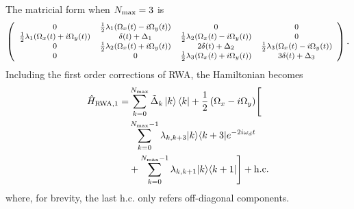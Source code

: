The matricial form when $N_{\mathrm{max}}=3$ is
\begin{equation}
  \footnotesize
  \left(\begin{array}{cccc}
      0                                                & \frac{1}{2} \lambda_1 (\Omega_{x}(t)-i \Omega_{y}(t)) & 0                                               & 0                                               \\
      \frac{1}{2} \lambda_1  (\Omega_{x}(t)+i \Omega_{y}(t)) & \delta (t)+\Delta_1                             & \frac{1}{2} \lambda_2 (\Omega_{x}(t)-i \Omega_{y}(t)) & 0                                               \\
      0                                                & \frac{1}{2} \lambda_2 (\Omega_{x}(t)+i \Omega_{y}(t)) & 2 \delta (t)+\Delta_2                           & \frac{1}{2} \lambda_3 (\Omega_{x}(t)-i \Omega_{y}(t)) \\
      0                                                & 0                                               & \frac{1}{2} \lambda_3 (\Omega_{x}(t)+i \Omega_{y}(t)) & 3 \delta (t)+\Delta_3                           \\
    \end{array}\right).
  \normalsize
  \label{eq:rwa_mat}
\end{equation}
Including the first order corrections of RWA, the Hamiltonian becomes
\begin{align}
  \Hrwa[1] = & \sum_{k=0}^{N_{{\rm{max}}}}\tilde{\Delta}_{k}\ket{k}\bra{k}+               %
  \frac{1}{2}\left(\Omega_x-i\Omega_y\right)
  \Biggr[\nonumber                                                                        \\
             & \sum_{k=0}^{N_{\rm{max}}-1}\lambda_{k,k+3}\ketbra{k}{k+3}e^{-2i\omega_d t}
  \nonumber                                                                               \\
             & +
    \sum_{k=0}^{\Nmax-1}\lambda_{k,k+1}\ketbra{k}{k+1}
    \Biggr]
  +\rm{h.c.}
  \label{eq:rwa_first_order}
\end{align}
where, for brevity, the last \rm{h.c.} only refers off-diagonal components.


